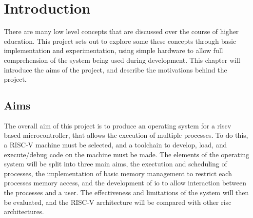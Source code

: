 \chapter{Introduction}
\label{cha:intro}
There are many low level concepts that are discussed over the course of higher education. This project sets out to explore some these concepts through basic implementation and experimentation, using simple hardware to allow full comprehension of the system being used during development. This chapter will introduce the aims of the project, and describe the motivations behind the project.
\section{Aims}
The overall aim of this project is to produce an operating system for a \gls{riscv} based microcontroller, that allows the execution of multiple processes. To do this, a RISC-V machine must be selected, and a toolchain to develop, load, and execute/debug code on the machine must be made. The elements of the operating system will be split into three main aims, the exectution and scheduling of processes, the implementation of basic memory management to restrict each processes memory access, and the development of \ac{io} to allow interaction between the processes and a user. The effectiveness and limitations of the system will then be evaluated, and the RISC-V architecture will be compared with other \ac{risc} architectures.

